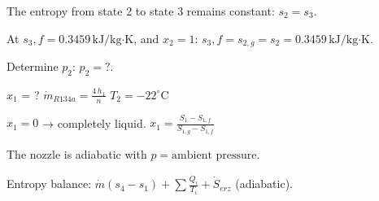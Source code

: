 The entropy from state 2 to state 3 remains constant:  
\( s_2 = s_3 \).  

At \( s_3,f = 0.3459 \, \text{kJ/kg·K} \),  
and \( x_2 = 1 \):  
\( s_3,f = s_{2,g} = s_2 = 0.3459 \, \text{kJ/kg·K} \).  

Determine \( p_2 \):  
\( p_2 = ? \).

\( x_1 \) = ?  
\( \dot{m}_{R134a} = \frac{4 \, h_1}{n} \)  
\( T_2 = -22^\circ \text{C} \)  

\( x_1 = 0 \) → completely liquid.  
\( x_1 = \frac{S_1 - S_{1,f}}{S_{1,g} - S_{1,f}} \)  

The nozzle is adiabatic with \( p = \text{ambient pressure} \).  

Entropy balance:  
\( \dot{m} (s_4 - s_1) + \sum \frac{\dot{Q}_i}{T_i} + \dot{S}_{erz} \)  
(adiabatic).